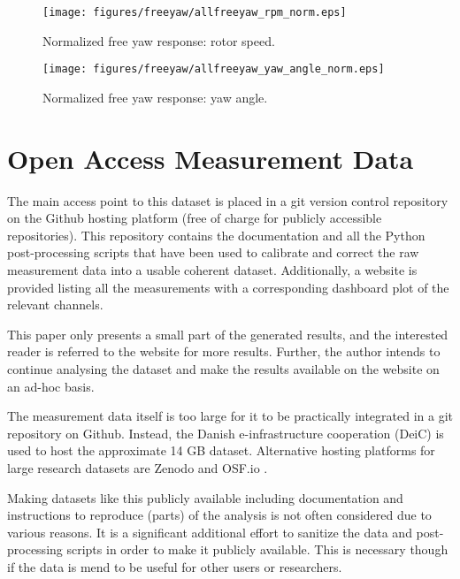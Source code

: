 \documentclass[a4paper]{jpconf}
\begin{document}
\begin{figure}[h]
\begin{minipage}{\textwidth}
\centering
\texttt{[image: figures/freeyaw/allfreeyaw\_rpm\_norm.eps]}
\caption{\label{allfreeyaw-respons-rpm-norm} Normalized free yaw response: rotor speed.}
\end{minipage}
\begin{minipage}{\textwidth}
\centering
\texttt{[image: figures/freeyaw/allfreeyaw\_yaw\_angle\_norm.eps]}
\caption{\label{allfreeyaw-respons-yaw-norm} Normalized free yaw response: yaw angle.}
\end{minipage} 
\end{figure}

\section{Open Access Measurement Data}

The main access point to this dataset is placed in a git version control repository on the Github hosting platform (free of charge for publicly accessible repositories). This repository \cite{github:freeyaw-ojf-wt-tests} contains the documentation and all the Python post-processing scripts that have been used to calibrate and correct the raw measurement data into a usable coherent dataset. Additionally, a website is provided listing all the measurements with a corresponding dashboard plot of the relevant channels.

This paper only presents a small part of the generated results, and the interested reader is referred to the website for more results. Further, the author intends to continue analysing the dataset and make the results available on the website on an ad-hoc basis.

The measurement data itself is too large for it to be practically integrated in a git repository on Github. Instead, the Danish e-infrastructure cooperation (DeiC) \cite{deic:datamanagement} is used to host the approximate 14 GB dataset. Alternative hosting platforms for large research datasets are Zenodo \cite{zenodo} and OSF.io \cite{osf}. 

Making datasets like this publicly available including documentation and instructions to reproduce (parts) of the analysis is not often considered due to various reasons. It is a significant additional effort to sanitize the data and post-processing scripts in order to make it publicly available. This is necessary though if the data is mend to be useful for other users or researchers. %
\end{document}
